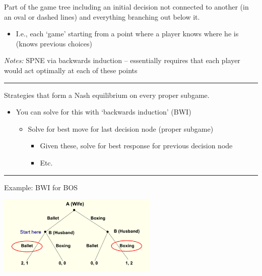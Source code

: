 \documentclass[]{article}
\providecommand{\tightlist}{%
  \setlength{\itemsep}{0pt}\setlength{\parskip}{0pt}}
\begin{document}
\begin{description}
\tightlist
\item[Proper subgame]
Part of the game tree including an initial decision not connected to another (in an oval or dashed lines) and everything branching out below it.
\end{description}

\begin{itemize}
\tightlist
\item
  I.e., each `game' starting from a point where a player knows where he is (knows previous choices)
\end{itemize}

\emph{Notes:}
SPNE via backwards induction -- essentially requires that each player would act optimally at each of these points

\begin{center}\rule{0.5\linewidth}{\linethickness}\end{center}

\begin{description}
\tightlist
\item[Subgame-Perfect Nash Equilibrium (SPNE)]
Strategies that form a Nash equilibrium on every proper subgame.
\end{description}

\begin{itemize}
\tightlist
\item
  You can solve for this with `backwards induction' (BWI)

  \begin{itemize}
  \tightlist
  \item
    Solve for best move for last decision node (proper subgame)

    \begin{itemize}
    \tightlist
    \item
      Given these, solve for best response for previous decision node
    \item
      Etc.
    \end{itemize}
  \end{itemize}
\end{itemize}

\begin{center}\rule{0.5\linewidth}{\linethickness}\end{center}

Example: BWI for BOS

\includegraphics[height=1.5in]{picsfigs/bosbwi1.png}
\end{document}
